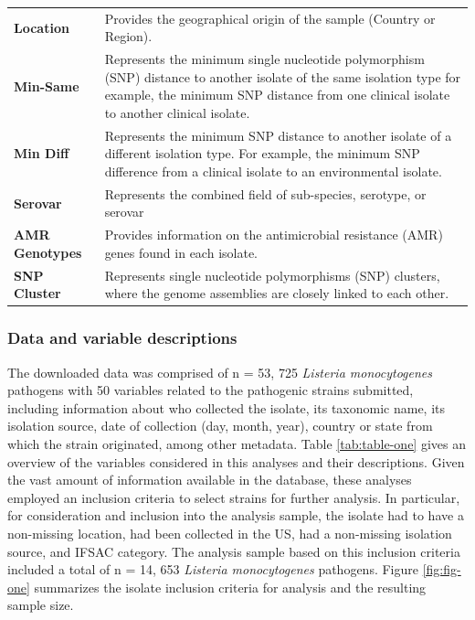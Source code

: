 \documentclass[
  10pt,
]{article}
\begin{document}
\begin{table}[H]
\begin{tabular}[t]{>{}l>{\raggedright\arraybackslash}p{11cm}}
\textbf{Location} & Provides the geographical origin of the sample (Country or Region).\\
\textbf{Min-Same} & Represents the minimum single nucleotide polymorphism (SNP) distance to another isolate of the same isolation type for example, the minimum SNP distance from one clinical isolate to another clinical isolate.\\
\addlinespace
\textbf{Min Diff} & Represents the minimum SNP distance to another isolate of a different isolation type. For example, the minimum SNP difference from a clinical isolate to an environmental isolate.\\
\textbf{Serovar} & Represents the combined field of sub-species, serotype, or serovar\\
\textbf{AMR Genotypes} & Provides information on the antimicrobial resistance (AMR) genes found in each isolate.\\
\textbf{SNP Cluster} & Represents single nucleotide polymorphisms (SNP) clusters, where the genome assemblies are closely linked to each other.\\
\bottomrule
\end{tabular}
\end{table}

\hypertarget{data-and-variable-descriptions}{%
\subsubsection{Data and variable descriptions}\label{data-and-variable-descriptions}}

The downloaded data was comprised of n = 53, 725 \emph{Listeria monocytogenes} pathogens with 50 variables related to the pathogenic strains submitted, including information about who collected the isolate, its taxonomic name, its isolation source, date of collection (day, month, year), country or state from which the strain originated, among other metadata. Table \ref{tab:table-one} gives an overview of the variables considered in this analyses and their descriptions. Given the vast amount of information available in the database, these analyses employed an inclusion criteria to select strains for further analysis. In particular, for consideration and inclusion into the analysis sample, the isolate had to have a non-missing location, had been collected in the US, had a non-missing isolation source, and IFSAC category. The analysis sample based on this inclusion criteria included a total of n = 14, 653 \emph{Listeria monocytogenes} pathogens. Figure \ref{fig:fig-one} summarizes the isolate inclusion criteria for analysis and the resulting sample size.
\end{document}
